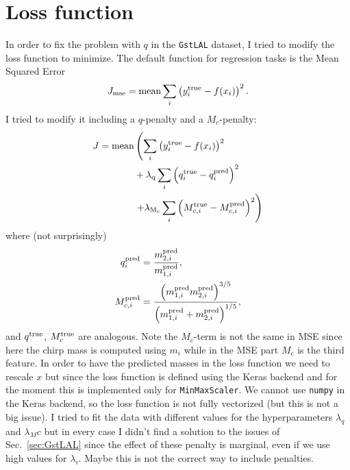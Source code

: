 \documentclass[prd,aps,twocolumn,a4paper,showkeys,nofootinbib]{revtex4-1}
\begin{document}
\section{Loss function}
\label{sec:loss}
In order to fix the problem with $q$ in the \texttt{GstLAL} dataset, 
I tried to modify the loss function to minimize.
The default function for regression tasks is the Mean Squared Error
\begin{equation}
J_{\rm mse} = {\rm mean} \sum_i \left( y^{\rm true}_i - f(x_i) \right)^2 .
\end{equation}
I tried to modify it including a $q$-penalty and a $M_c$-penalty:
\begin{align}
J =  {\rm mean} & \left(  \sum_i \left( y^{\rm true}_i - f(x_i) \right)^2 \right.   \nonumber \\
&  + \lambda_{\rm q} \sum_i \left( q^{\rm true}_i - q^{\rm pred}_i \right)^2
\nonumber \\
& \left. + \lambda_{\rm M_c} \sum_i \left( M_{c,i}^{\rm true} - M_{c,i}^{\rm pred} \right)^2 \right)
\end{align}
where (not surprisingly)
\begin{align}
q^{\rm pred}_i &  = \frac{m_{2,i}^{\rm pred}}{m_{1,i}^{\rm pred}}, \\
M_{c,i}^{\rm pred} & = 
\frac{\left(m_{1,i}^{\rm pred}m_{2,i}^{\rm pred} \right)^{3/5}}{\left(m_{1,i}^{\rm pred}+m_{2,i}^{\rm pred}\right)^{1/5}},
\end{align}
and $q^{\rm true}$, $M_c^{\rm true}$ are analogous. Note the $M_c$-term is not the same 
in MSE since here the chirp mass is computed using $m_i$ while in the MSE part $M_c$ 
is the third feature.
In order to have the predicted masses in the loss function we need to 
rescale $x$ but since the loss function is defined using the Keras backend and 
for the moment this is implemented only for  \texttt{MinMaxScaler}. 
We cannot use \texttt{numpy} in the Keras backend, so the loss function is not fully vectorized
(but this is not a big issue). 
I tried to fit the data with different values for the hyperparameters $\lambda_q$ and
$\lambda_Mc$ but in every case I didn't find a solution to the issues of Sec.~\ref{sec:GstLAL}
since the effect of these penalty is marginal, even if we use high values for $\lambda_i$.
Maybe this is not the correct way to include penalties.

\end{document}

